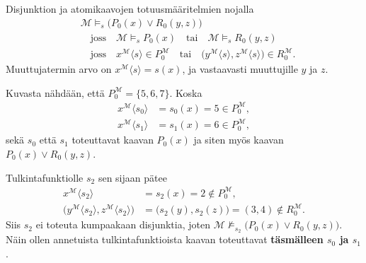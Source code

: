 \documentclass[11pt,a4paper]{amsart}
\begin{document}
\begin{solution}
  Disjunktion ja atomikaavojen totuusmääritelmien nojalla
  \[
    \begin{aligned}
      &\mathcal M \models_s \bigl(P_0(x) \lor R_0(y,z)\bigr) \\
      &\quad\text{joss}\quad
      \mathcal M \models_s P_0(x)
      \quad\text{tai}\quad
      \mathcal M \models_s R_0(y,z) \\
      &\quad\text{joss}\quad
      x^{\mathcal M}\langle s\rangle \in P_0^{\mathcal M}
      \quad\text{tai}\quad
      \bigl(y^{\mathcal M}\langle s\rangle,
      z^{\mathcal M}\langle s\rangle\bigr)
      \in R_0^{\mathcal M}.
    \end{aligned}
  \]
  Muuttujatermin arvo on \(x^{\mathcal M}\langle s\rangle = s(x)\),
  ja vastaavasti muuttujille \(y\) ja \(z\).

  Kuvasta nähdään, että \(P_0^{\mathcal M} = \{5,6,7\}\). Koska
  \[
    \begin{aligned}
      x^{\mathcal M}\langle s_0\rangle &= s_0(x) = 5
      \in P_0^{\mathcal M}, \\
      x^{\mathcal M}\langle s_1\rangle &= s_1(x) = 6
      \in P_0^{\mathcal M},
    \end{aligned}
  \]
  sekä \(s_0\) että \(s_1\) toteuttavat kaavan \(P_0(x)\) ja siten
  myös kaavan \(P_0(x) \lor R_0(y,z)\).

  Tulkintafunktiolle \(s_2\) sen sijaan pätee
  \[
    \begin{aligned}
      x^{\mathcal M}\langle s_2\rangle &= s_2(x) = 2
      \notin P_0^{\mathcal M}, \\
      \bigl(y^{\mathcal M}\langle s_2\rangle,
      z^{\mathcal M}\langle s_2\rangle\bigr)
      &= \bigl(s_2(y),s_2(z)\bigr) = (3,4)
      \notin R_0^{\mathcal M}.
    \end{aligned}
  \]
  Siis \(s_2\) ei toteuta kumpaakaan disjunktia, joten
  \(\mathcal M \not\models_{s_2} \bigl(P_0(x) \lor R_0(y,z)\bigr)\).
  Näin ollen annetuista tulkintafunktioista kaavan toteuttavat
  \textbf{täsmälleen \(s_0\) ja \(s_1\)}.
\end{solution}

\newpage
\end{document}

